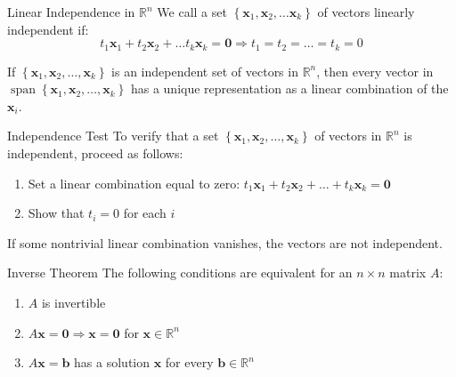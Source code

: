 \documentclass[12pt]{article}
\begin{document}
\begin{definition}{Linear Independence in $ \mathbb{R}^n $}{}
    We call a set $ \left\{ \mathbf{x}_1, \mathbf{x}_2, \dots \mathbf{x}_k \right\} $ of vectors linearly independent if:
    \[ t_1 \mathbf{x}_1 + t_2 \mathbf{x}_2 + \dots t_k \mathbf{x}_k = \mathbf{0} \Longrightarrow t_1 = t_2 = \dots = t_k = 0 \]
\end{definition}

\begin{theorem}{}{}
    If $ \left\{ \mathbf{x}_1, \mathbf{x}_2, \dots, \mathbf{x}_k \right\} $ is an independent set of vectors in $ \mathbb{R}^n $, then every vector in $ \operatorname{span} \left\{ \mathbf{x}_1, \mathbf{x}_2, \dots, \mathbf{x}_k \right\} $ has a unique representation as a linear combination of the $ \mathbf{x}_i $.
\end{theorem}

\begin{theorem}{Independence Test}{}
    To verify that a set $ \left\{ \mathbf{x}_1, \mathbf{x}_2, \dots, \mathbf{x}_k \right\} $ of vectors in $ \mathbb{R}^n $ is independent, proceed as follows:
    \begin{enumerate}
        \item Set a linear combination equal to zero: $ t_1 \mathbf{x}_1 + t_2 \mathbf{x}_2 + \dots + t_k \mathbf{x}_k = \mathbf{0} $
        \item Show that $ t_i = 0 $ for each $ i $
    \end{enumerate}
    If some nontrivial linear combination vanishes, the vectors are not independent.
\end{theorem}

\begin{theorem}{Inverse Theorem}{}
    The following conditions are equivalent for an $ n \times n $ matrix $ A $:
    \begin{enumerate}
        \item $ A $ is invertible
        \item $ A \mathbf{x} = \mathbf{0} \Longrightarrow \mathbf{x} = \mathbf{0} $ for $ \mathbf{x} \in \mathbb{R}^n $
        \item $ A \mathbf{x} = \mathbf{b} $ has a solution $ \mathbf{x} $ for every $ \mathbf{b} \in \mathbb{R}^n $
    \end{enumerate}
\end{theorem}
\end{document}
